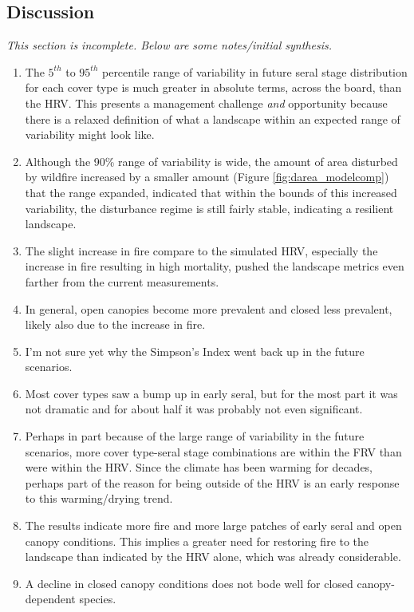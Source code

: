 \documentclass[12pt]{article}
\begin{document}
\begin{spacing}{1}
\section*{Discussion}

\emph{This section is incomplete. Below are some notes/initial synthesis.}
\begin{enumerate}
	\item The $5^{th}$ to $95^{th}$ percentile range of variability in future seral stage distribution for each cover type is much greater in absolute terms, across the board, than the HRV. This presents a management challenge \emph{and} opportunity because there is a relaxed definition of what a landscape within an expected range of variability might look like.
	\item Although the 90\% range of variability is wide, the amount of area disturbed by wildfire increased by a smaller amount (Figure \ref{fig:darea_modelcomp}) that the range expanded, indicated that within the bounds of this increased variability, the disturbance regime is still fairly stable, indicating a resilient landscape. %
	\item The slight increase in fire compare to the simulated HRV, especially the increase in fire resulting in high mortality, pushed the landscape metrics even farther from the current measurements.
	\item In general, open canopies become more prevalent and closed less prevalent, likely also due to the increase in fire. 
	\item I'm not sure yet why the Simpson's Index went back up in the future scenarios.
	\item Most cover types saw a bump up in early seral, but for the most part it was not dramatic and for about half it was probably not even significant. %
	\item Perhaps in part because of the large range of variability in the future scenarios, more cover type-seral stage combinations are within the FRV than were within the HRV. Since the climate has been warming for decades, perhaps part of the reason for being outside of the HRV is an early response to this warming/drying trend.
	\item The results indicate more fire and more large patches of early seral and open canopy conditions. This implies a greater need for restoring fire to the landscape than indicated by the HRV alone, which was already considerable.
	\item A decline in closed canopy conditions does not bode well for closed canopy-dependent species.

\end{enumerate}
\end{spacing}
\end{document}
